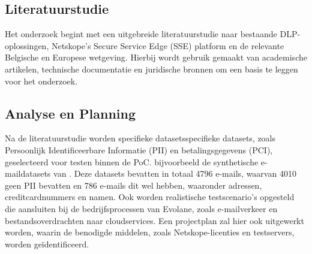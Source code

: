 


\subsection{Literatuurstudie}%

Het onderzoek begint met een uitgebreide literatuurstudie naar bestaande DLP-oplossingen, Netskope's Secure Service Edge (SSE) platform en de relevante Belgische en Europese wetgeving. 
Hierbij wordt gebruik gemaakt van academische artikelen, technische documentatie en juridische bronnen om een basis te leggen voor het onderzoek.

\subsection{Analyse en Planning}%

Na de literatuurstudie worden specifieke datasetsspecifieke datasets, zoals Persoonlijk Identificeerbare Informatie (PII) 
en betalingsgegevens (PCI), geselecteerd voor testen binnen de PoC. 
bijvoorbeeld de synthetische e-maildatasets van \textcite{Whelan2014}.
Deze datasets bevatten in totaal 4796 e-mails, waarvan 4010 geen PII bevatten en 786 e-mails dit wel hebben, 
waaronder adressen, creditcardnummers en namen. 
Ook worden realistische testscenario's opgesteld die aansluiten bij de bedrijfsprocessen van Evolane, zoals e-mailverkeer en bestandsoverdrachten 
naar cloudservices. Een projectplan zal hier ook uitgewerkt worden, waarin de benodigde middelen, zoals Netskope-licenties en testservers, worden 
geïdentificeerd.


